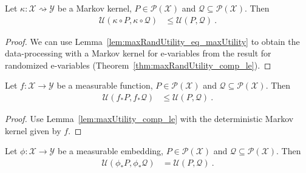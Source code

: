 \begin{lemma}\label{lem:maxUtility_comp_le}
  \leanok
Let $\kappa : \mathcal{X} \rightsquigarrow \mathcal{Y}$ be a Markov kernel, $P \in \mathcal{P}(\mathcal{X})$ and $\mathcal{Q} \subseteq \mathcal{P}(\mathcal{X})$.
Then
\begin{align*}
  \mathcal{U}(\kappa \circ P, \kappa \circ \mathcal{Q})
  &\le \mathcal{U}(P, \mathcal{Q})
  \: .
\end{align*}
\end{lemma}

\begin{proof}\leanok
We can use Lemma~\ref{lem:maxRandUtility_eq_maxUtility} to obtain the data-processing with a Markov kernel for e-variables from the result for randomized e-variables (Theorem~\ref{thm:maxRandUtility_comp_le}).
\end{proof}


\begin{lemma}\label{lem:maxUtility_map_le}
  \leanok
Let $f : \mathcal{X} \to \mathcal{Y}$ be a measurable function, $P \in \mathcal{P}(\mathcal{X})$ and $\mathcal{Q} \subseteq \mathcal{P}(\mathcal{X})$.
Then
\begin{align*}
  \mathcal{U}(f_*P, f_* \mathcal{Q})
  &\le \mathcal{U}(P, \mathcal{Q})
  \: .
\end{align*}
\end{lemma}

\begin{proof}\leanok
Use Lemma~\ref{lem:maxUtility_comp_le} with the deterministic Markov kernel given by $f$.
\end{proof}


\begin{lemma}\label{lem:maxUtility_map_eq}
  \leanok
Let $\phi : \mathcal{X} \to \mathcal{Y}$ be a measurable embedding, $P \in \mathcal{P}(\mathcal{X})$ and $\mathcal{Q} \subseteq \mathcal{P}(\mathcal{X})$.
Then
\begin{align*}
  \mathcal{U}(\phi_* P, \phi_* \mathcal{Q})
  &= \mathcal{U}(P, \mathcal{Q})
  \: .
\end{align*}
\end{lemma}

